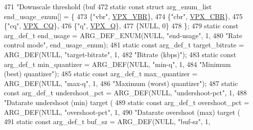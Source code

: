 \begin{DoxyCodeInclude}
{{{{471                                                     \textcolor{stringliteral}{"Downscale threshold (buf %
472 \textcolor{keyword}{static} \textcolor{keyword}{const} \textcolor{keyword}{struct }arg\_enum\_list end\_usage\_enum[] = \{
473   \{\textcolor{stringliteral}{"vbr"}, \hyperlink{group__encoder_ggaf50e74d91be4cae6f70dfeba5b7410d2ab8fbe4441ed3f31a167c8194e8a64f87}{VPX\_VBR}\},
474   \{\textcolor{stringliteral}{"cbr"}, \hyperlink{group__encoder_ggaf50e74d91be4cae6f70dfeba5b7410d2a8b02853cb35790d60cc171a11f6c268a}{VPX\_CBR}\},
475   \{\textcolor{stringliteral}{"cq"},  \hyperlink{group__encoder_ggaf50e74d91be4cae6f70dfeba5b7410d2a5f2fd02b55c67d62bfd79380bcb03f63}{VPX\_CQ}\},
476   \{\textcolor{stringliteral}{"q"},   \hyperlink{group__encoder_ggaf50e74d91be4cae6f70dfeba5b7410d2a5ebb5564dc5e8ec99d3c6221d89b8858}{VPX\_Q}\},
477   \{NULL, 0\}
478 \};
479 \textcolor{keyword}{static} \textcolor{keyword}{const} arg\_def\_t end\_usage          = ARG\_DEF\_ENUM(NULL, \textcolor{stringliteral}{"end-usage"}, 1,
480                                                          \textcolor{stringliteral}{"Rate control mode"}, end\_usage\_enum);
481 \textcolor{keyword}{static} \textcolor{keyword}{const} arg\_def\_t target\_bitrate     = ARG\_DEF(NULL, \textcolor{stringliteral}{"target-bitrate"}, 1,
482                                                     \textcolor{stringliteral}{"Bitrate (kbps)"});
483 \textcolor{keyword}{static} \textcolor{keyword}{const} arg\_def\_t min\_quantizer      = ARG\_DEF(NULL, \textcolor{stringliteral}{"min-q"}, 1,
484                                                     \textcolor{stringliteral}{"Minimum (best) quantizer"});
485 \textcolor{keyword}{static} \textcolor{keyword}{const} arg\_def\_t max\_quantizer      = ARG\_DEF(NULL, \textcolor{stringliteral}{"max-q"}, 1,
486                                                     \textcolor{stringliteral}{"Maximum (worst) quantizer"});
487 \textcolor{keyword}{static} \textcolor{keyword}{const} arg\_def\_t undershoot\_pct     = ARG\_DEF(NULL, \textcolor{stringliteral}{"undershoot-pct"}, 1,
488                                                     \textcolor{stringliteral}{"Datarate undershoot (min) target (%
489 \textcolor{keyword}{static} \textcolor{keyword}{const} arg\_def\_t overshoot\_pct      = ARG\_DEF(NULL, \textcolor{stringliteral}{"overshoot-pct"}, 1,
490                                                     \textcolor{stringliteral}{"Datarate overshoot (max) target (%
491 \textcolor{keyword}{static} \textcolor{keyword}{const} arg\_def\_t buf\_sz             = ARG\_DEF(NULL, \textcolor{stringliteral}{"buf-sz"}, 1,
}}}}}}}
\end{DoxyCodeInclude}
